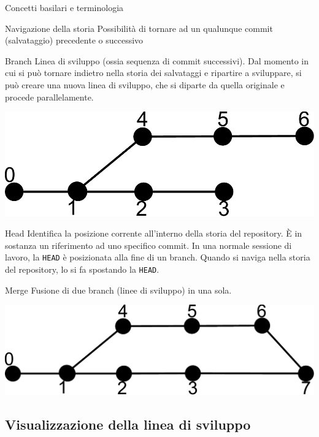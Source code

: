 \documentclass[xcolor=dvipsnames,presentation]{beamer}
\begin{document}
\begin{frame}[allowframebreaks]{Concetti basilari e terminologia}
	\begin{block}{Navigazione della storia}
		Possibilità di tornare ad un qualunque commit (salvataggio) precedente o successivo
	\end{block}
	\begin{block}{Branch}
		Linea di sviluppo (ossia sequenza di commit successivi). Dal momento in cui si può tornare indietro nella storia dei salvataggi e ripartire a sviluppare, si può creare una nuova linea di sviluppo, che si diparte da quella originale e procede parallelamente.
		\begin{center}
			\includegraphics[height=.4\textheight]{img/branch}
		\end{center}
	\end{block}
	\begin{block}{Head}
		Identifica la posizione corrente all'interno della storia del repository.
		È in sostanza un riferimento ad uno specifico commit.
		In una normale sessione di lavoro, la \texttt{HEAD} è posizionata alla fine di un branch.
		Quando si naviga nella storia del repository, lo si fa spostando la \texttt{HEAD}.
	\end{block}
	\begin{block}{Merge}
		Fusione di due branch (linee di sviluppo) in una sola.
		\begin{center}
			\includegraphics[width=.99\textwidth]{img/merge}
		\end{center}
	\end{block}
\end{frame}

\subsection{Visualizzazione della linea di sviluppo}
\end{document}
